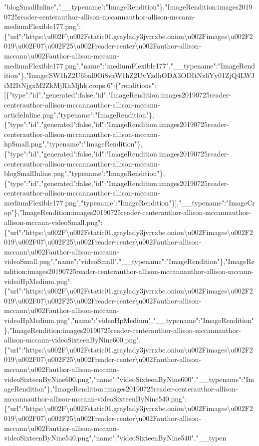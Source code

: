 "blogSmallInline","\_\_typename":"ImageRendition"\},"ImageRendition:images20190725reader-centerauthor-allison-mccannauthor-allison-mccann-mediumFlexible177.png":\{"url":"https:\textbackslash{}u002F\textbackslash{}u002Fstatic01.graylady3jvrrxbe.onion\textbackslash{}u002Fimages\textbackslash{}u002F2019\textbackslash{}u002F07\textbackslash{}u002F25\textbackslash{}u002Freader-center\textbackslash{}u002Fauthor-allison-mccann\textbackslash{}u002Fauthor-allison-mccann-mediumFlexible177.png","name":"mediumFlexible177","\_\_typename":"ImageRendition"\},"Image:SW1hZ2U6bnl0Oi8vaW1hZ2UvYzdhODA3ODItNzliYy01ZjQ4LWJiM2ItNjgxM2ZkMjRhMjhk.crops.6":\{"renditions":{[}\{"type":"id","generated":false,"id":"ImageRendition:images20190725reader-centerauthor-allison-mccannauthor-allison-mccann-articleInline.png","typename":"ImageRendition"\},\{"type":"id","generated":false,"id":"ImageRendition:images20190725reader-centerauthor-allison-mccannauthor-allison-mccann-hpSmall.png","typename":"ImageRendition"\},\{"type":"id","generated":false,"id":"ImageRendition:images20190725reader-centerauthor-allison-mccannauthor-allison-mccann-blogSmallInline.png","typename":"ImageRendition"\},\{"type":"id","generated":false,"id":"ImageRendition:images20190725reader-centerauthor-allison-mccannauthor-allison-mccann-mediumFlexible177.png","typename":"ImageRendition"\}{]},"\_\_typename":"ImageCrop"\},"ImageRendition:images20190725reader-centerauthor-allison-mccannauthor-allison-mccann-videoSmall.png":\{"url":"https:\textbackslash{}u002F\textbackslash{}u002Fstatic01.graylady3jvrrxbe.onion\textbackslash{}u002Fimages\textbackslash{}u002F2019\textbackslash{}u002F07\textbackslash{}u002F25\textbackslash{}u002Freader-center\textbackslash{}u002Fauthor-allison-mccann\textbackslash{}u002Fauthor-allison-mccann-videoSmall.png","name":"videoSmall","\_\_typename":"ImageRendition"\},"ImageRendition:images20190725reader-centerauthor-allison-mccannauthor-allison-mccann-videoHpMedium.png":\{"url":"https:\textbackslash{}u002F\textbackslash{}u002Fstatic01.graylady3jvrrxbe.onion\textbackslash{}u002Fimages\textbackslash{}u002F2019\textbackslash{}u002F07\textbackslash{}u002F25\textbackslash{}u002Freader-center\textbackslash{}u002Fauthor-allison-mccann\textbackslash{}u002Fauthor-allison-mccann-videoHpMedium.png","name":"videoHpMedium","\_\_typename":"ImageRendition"\},"ImageRendition:images20190725reader-centerauthor-allison-mccannauthor-allison-mccann-videoSixteenByNine600.png":\{"url":"https:\textbackslash{}u002F\textbackslash{}u002Fstatic01.graylady3jvrrxbe.onion\textbackslash{}u002Fimages\textbackslash{}u002F2019\textbackslash{}u002F07\textbackslash{}u002F25\textbackslash{}u002Freader-center\textbackslash{}u002Fauthor-allison-mccann\textbackslash{}u002Fauthor-allison-mccann-videoSixteenByNine600.png","name":"videoSixteenByNine600","\_\_typename":"ImageRendition"\},"ImageRendition:images20190725reader-centerauthor-allison-mccannauthor-allison-mccann-videoSixteenByNine540.png":\{"url":"https:\textbackslash{}u002F\textbackslash{}u002Fstatic01.graylady3jvrrxbe.onion\textbackslash{}u002Fimages\textbackslash{}u002F2019\textbackslash{}u002F07\textbackslash{}u002F25\textbackslash{}u002Freader-center\textbackslash{}u002Fauthor-allison-mccann\textbackslash{}u002Fauthor-allison-mccann-videoSixteenByNine540.png","name":"videoSixteenByNine540","\_\_typen